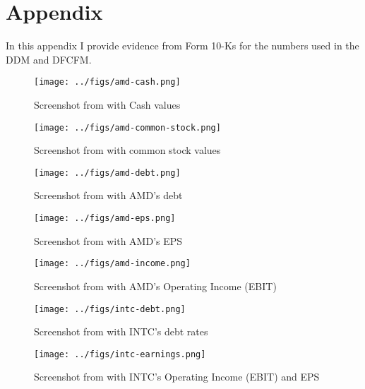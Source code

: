 \section{Appendix}
\label{sec:appendix}

In this appendix I provide evidence from Form 10-Ks for the numbers used in the DDM and DFCFM.

\begin{figure}[h!]
    \centering
    \texttt{[image: ../figs/amd-cash.png]}
    \caption{Screenshot from \citet{amd_10_k} with Cash values}
    \label{amd_cash}
\end{figure}

\begin{figure}[h!]
    \centering
    \texttt{[image: ../figs/amd-common-stock.png]}
    \caption{Screenshot from \citet{amd_10_k} with common stock values}
    \label{amd_cs}
\end{figure}

\begin{figure}[h!]
    \centering
    \texttt{[image: ../figs/amd-debt.png]}
    \caption{Screenshot from \citet{amd_10_k} with AMD's debt}
    \label{amd_debt}
\end{figure}

\begin{figure}[h!]
    \centering
    \texttt{[image: ../figs/amd-eps.png]}
    \caption{Screenshot from \citet{amd_10_k} with AMD's EPS}
    \label{amd_eps}
\end{figure}

\begin{figure}[h!]
    \centering
    \texttt{[image: ../figs/amd-income.png]}
    \caption{Screenshot from \citet{amd_10_k} with AMD's Operating Income (EBIT)}
    \label{amd_ebit}
\end{figure}

\begin{figure}[h!]
    \centering
    \texttt{[image: ../figs/intc-debt.png]}
    \caption{Screenshot from \citet{intel_10_k} with INTC's debt rates}
    \label{intc_debt_rate}
\end{figure}

\begin{figure}[h!]
    \centering
    \texttt{[image: ../figs/intc-earnings.png]}
    \caption{Screenshot from \citet{intel_10_k} with INTC's Operating Income (EBIT) and EPS}
    \label{intc_ebit}
\end{figure}

